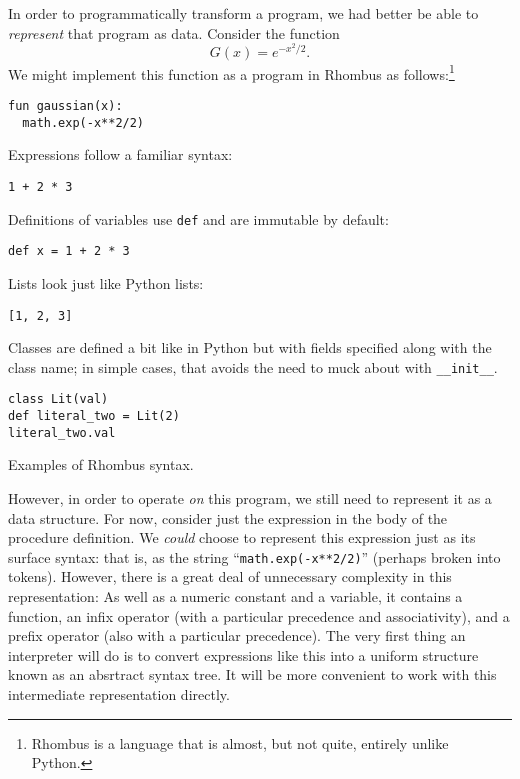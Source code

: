 \documentclass[11pt, a4paper]{article}
\newcommand{\cd}[1]{\texttt{#1}}
\begin{document}
In order to programmatically transform a program, we had better be
able to \emph{represent} that program as data. Consider the function
\begin{equation}
  \label{eq:gaussian-example}
  G(x) = e^{-x^2/2}.
\end{equation}
We might implement this function as a program in Rhombus
as follows:\footnote{Rhombus is a language that is almost, but not quite,
  entirely unlike Python.}
\begin{verbatim}
fun gaussian(x):
  math.exp(-x**2/2)
\end{verbatim}
\begin{marginfigure}\footnotesize
  Expressions follow a familiar syntax:
\begin{verbatim}
1 + 2 * 3
\end{verbatim}
  Definitions of variables use \cd{def} and are immutable by default:
\begin{verbatim}
def x = 1 + 2 * 3
\end{verbatim}
  Lists look just like Python lists:
\begin{verbatim}
[1, 2, 3]
\end{verbatim}
  Classes are defined a bit like in Python but with fields specified
  along with the class name; in simple cases, that avoids the need to
  muck about with \cd{__init__}.
\begin{verbatim}
class Lit(val)
def literal_two = Lit(2)
literal_two.val 
\end{verbatim}
  \caption{Examples of Rhombus syntax.}
\end{marginfigure}
However, in order to operate \emph{on} this program, we still need to
represent it as a data structure. For now, consider just the
expression in the body of the procedure definition. We \emph{could}
choose to represent this expression just as its surface syntax: that
is, as the string ``\cd{math.exp(-x**2/2)}'' (perhaps broken into
tokens). However, there is a great deal of unnecessary complexity in
this representation: As well as a numeric constant and a variable, it
contains a function, an infix operator (with a particular precedence
and associativity), and a prefix operator (also with a particular
precedence). The very first thing an interpreter will do is to convert
expressions like this into a uniform structure known as an absrtract
syntax tree. It will be more convenient to work with this intermediate
representation directly.
\end{document}
